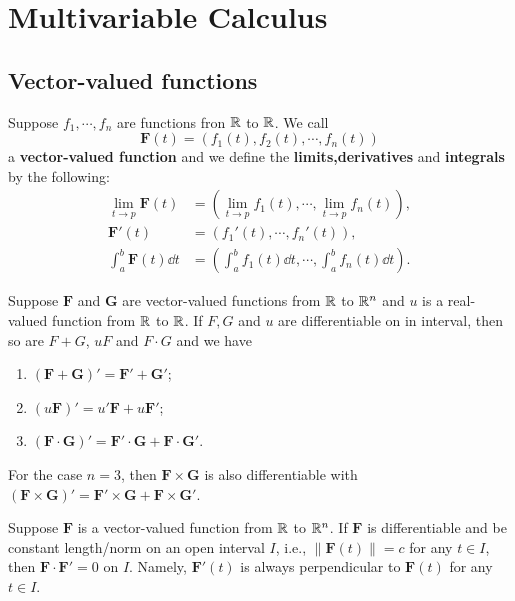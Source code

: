     \chapter{Multivariable Calculus}
    \section{Vector-valued functions}
    \begin{definitionenv}
        Suppose $f_1,\cdots,f_n$ are functions fron $\mathbb{R}$ to $\mathbb{R}$. We call $$\bm F(t) = (f_1(t), f_2(t), \cdots, f_n(t))$$ a \textbf{vector-valued function} and we define the \textbf{limits,derivatives} and \textbf{integrals} by the following:
        $$ \begin{aligned}
            \lim_{t\to p} \bm F(t) &= \left( \lim_{t\to p} f_1(t), \cdots, \lim_{t\to p} f_n(t) \right),\\
            \bm F'(t) &= (f_1'(t), \cdots, f_n'(t)),\\
            \int_a^b \bm F(t) \dd t &= \left( \int_a^b f_1(t) \dd t, \cdots, \int_a^b f_n(t) \dd t \right).
        \end{aligned} $$
    \end{definitionenv}
    \begin{theoremenv}
        Suppose $\bm F$ and $\bm G$ are vector-valued functions from $\mathbb{R}$ to $\mathbb{R}^n$ and $u$ is a real-valued function from $\mathbb{R}$ to $\mathbb{R}$. If $F,G$ and $u$ are differentiable on in interval, then so are $F+G$, $uF$ and $F\cdot G$ and we have
        \begin{enumerate}[label=(\arabic*)]
            \item $(\bm F+\bm G)' = \bm F' + \bm G'$;
            \item $(u\bm F)' = u' \bm F + u \bm F'$;
            \item $(\bm F\cdot \bm G)' = \bm F'\cdot \bm G + \bm F\cdot \bm G'$.
        \end{enumerate}
        For the case $n=3$, then $\bm F\times \bm G$ is also differentiable with $(\bm F\times \bm G)' = \bm F'\times \bm G + \bm F \times \bm G'$.
    \end{theoremenv}
    \begin{propositionenv}
        Suppose $\bm F$ is a vector-valued function from $\mathbb{R}$ to $\mathbb{R}^n$. If $\bm F$ is differentiable and be constant length/norm on an open interval $I$, i.e., $\| \bm F(t)\| = c$ for any $t\in I$, then $\bm F \cdot \bm F' = 0$ on $I$. Namely, $\bm F'(t)$ is always perpendicular to $\bm F(t)$ for any $t\in I$.
    \end{propositionenv}
